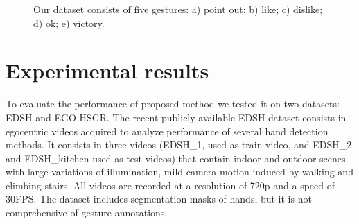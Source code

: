 \begin{figure}[tb]
\centering
{}
\caption{Our dataset consists of five gestures: a) point out; b) like; c) dislike; d) ok; e) victory.}
\label{fig:gesture_samples}
\end{figure}

\section{Experimental results}
To evaluate the performance of proposed method we tested it on two datasets: EDSH and EGO-HSGR.
The recent publicly available EDSH dataset \cite{li13} consists in egocentric videos acquired to analyze performance of several hand detection methods. It consists in three videos (EDSH\_1, used as train video, and EDSH\_2 and EDSH\_{kitchen} used as test videos) that contain indoor and outdoor scenes with large variations of illumination, mild camera motion induced by walking and climbing stairs. All videos are recorded at a resolution of 720p and a speed of 30FPS. The dataset includes segmentation masks of hands, but it is not comprehensive of gesture annotations.     


